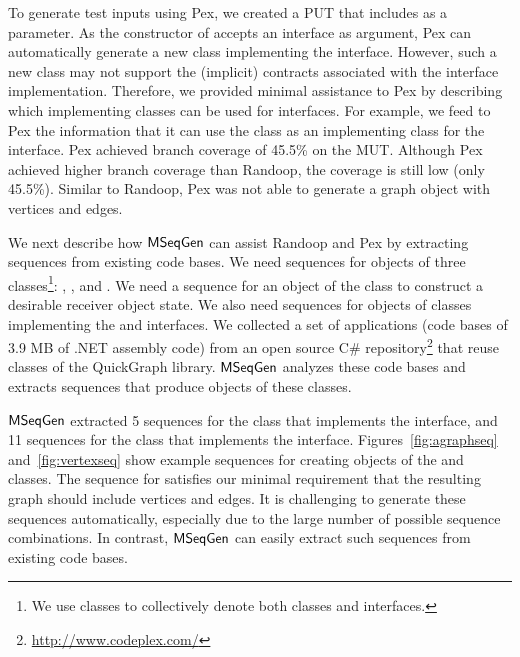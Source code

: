 \documentclass{sig-alternate}
\begin{document}
To generate test inputs using Pex, we created a PUT that includes  as a parameter. As the constructor of  accepts an interface  as argument, Pex can automatically generate a new class implementing the  interface. However, such a new class may not support the (implicit) contracts associated with the interface implementation. Therefore, we provided minimal assistance to Pex by describing which implementing classes can be used for interfaces. For example, we feed to Pex the information that it can use the  class as an implementing class for the  interface. Pex achieved branch coverage of 45.5\% on the MUT. Although Pex achieved higher branch coverage than Randoop, the coverage is still low (only 45.5\%). Similar to Randoop, Pex was not able to generate a graph object with vertices and edges.

We next describe how $\textsf{MSeqGen} $ can assist Randoop and Pex by extracting sequences from existing code bases. 
We need sequences for objects of three classes\footnote{We use classes to collectively denote both classes and interfaces.}: , , and . We need a  sequence for an object of the  class to construct a desirable receiver object state. We also need sequences for objects of classes implementing the  and  interfaces. 
We collected a set of applications (code bases of 3.9 MB of .NET assembly code) from an open source C\# repository\footnote{\url{http://www.codeplex.com/}} that reuse classes of the QuickGraph library.
$\textsf{MSeqGen} $ analyzes these code bases and extracts sequences that produce objects of these classes.

$\textsf{MSeqGen} $ extracted 5 sequences for the  class that implements the  interface, and 11 sequences for the  class that implements the  interface. Figures~\ref{fig:agraphseq} and~\ref{fig:vertexseq} show example sequences for creating objects of the  and  classes. The  sequence for   satisfies our minimal requirement that the resulting graph should include vertices and edges. It is challenging to generate these sequences automatically, especially due to the large number of possible sequence combinations. In contrast, $\textsf{MSeqGen} $ can easily extract such sequences from existing code bases.
\end{document}
